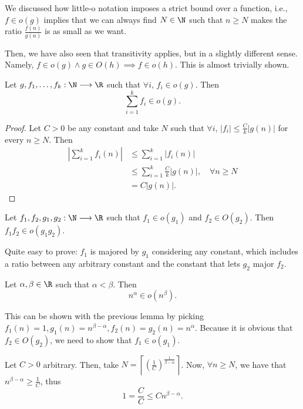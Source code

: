 
\begin{previouslyseen}
    We discussed how little-o notation imposes a strict bound over a function, i.e., $f\in o(g)$ implies that we can always find $N\in \N$ such that $n\ge N$ makes the ratio $\frac{f(n)}{g(n)}$ is as small as we want.

    Then, we have also seen that transitivity applies, but in a slightly different sense.
    Namely, $f\in o(g) \land g\in O(h) \implies f\in o(h)$.
    This is almost trivially shown.
\end{previouslyseen}

\begin{lemma}
    Let $g,f_1,\ldots,f_k : \N \longrightarrow \R$ such that $\forall i,\,f_i \in o(g)$.
    Then \[
    \sum_{i=1}^{k} f_i \in o(g)
    .\]
\end{lemma}
\begin{proof}
    Let $C>0$ be any constant and take $N$ such that $\forall i,\,|f_i|\le \frac{C}{k}|g(n)|$ for every $n\ge N$.
    Then
    \begin{align*}
	\left| \sum_{i=1}^{k} f_i(n) \right| &\le \sum_{i=1}^{k} |f_i(n)| \\
					     &\le \sum_{i=1}^{k} \frac{C}{k}|g(n)|,\quad \forall n\ge N \\
					     &= C|g(n)|
    .\end{align*}
\end{proof}

\begin{lemma}
    Let $f_1,f_2,g_1,g_2 : \N \longrightarrow \R$ such that $f_1\in o(g_1)$ and $f_2\in O(g_2)$.
    Then $f_1f_2\in o(g_1g_2)$.
\end{lemma}
Quite easy to prove: $f_1$ is majored by $g_1$ considering any constant, which includes a ratio between any arbitrary constant and the constant that lets $g_2$ major $f_2$.

\begin{eg}
    Let $\alpha,\beta \in \R$ such that $\alpha < \beta$.
    Then \[
    n^{\alpha}\in o\left( n^{\beta} \right) 
    .\]

    This can be shown with the previous lemma by picking $f_1(n)=1,g_1(n)=n^{\beta-\alpha},f_2(n)=g_2(n)=n^{\alpha}$.
    Because it is obvious that $f_2\in O(g_2)$, we need to show that $f_1\in o(g_1)$.

    Let $C>0$ arbitrary.
    Then, take $N=\left\lceil \left( \frac{1}{C} \right)^{\frac{1}{\beta-\alpha}} \right\rceil $.
    Now, $\forall n\ge N$, we have that $n^{\beta-\alpha}\ge \frac{1}{C}$, thus \[
    1 = \frac{C}{C} \le Cn^{\beta-\alpha}
    .\] 
\end{eg}


